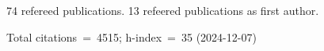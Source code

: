 74 refereed publications. 13 refeered publications as first author.

Total citations~=~4515; h-index~=~35 (2024-12-07)